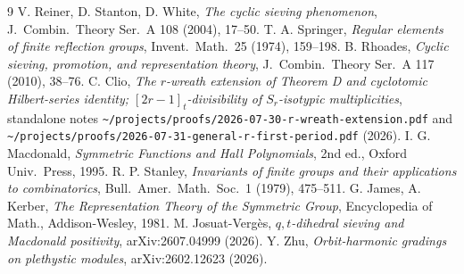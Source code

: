 \documentclass[11pt]{article}
\theoremstyle{definition}
\theoremstyle{remark}
\begin{document}
\begin{thebibliography}{9}
 V. Reiner, D. Stanton, D. White,
  \emph{The cyclic sieving phenomenon},
  J.~Combin.~Theory Ser.~A 108 (2004), 17--50.
 T. A. Springer,
  \emph{Regular elements of finite reflection groups},
  Invent.~Math.~25 (1974), 159--198.
 B. Rhoades,
  \emph{Cyclic sieving, promotion, and representation theory},
  J.~Combin.~Theory Ser.~A 117 (2010), 38--76.
 C. Clio,
  \emph{The $r$-wreath extension of Theorem D and cyclotomic Hilbert-series identity;
        $[2r-1]_t$-divisibility of $S_r$-isotypic multiplicities},
  standalone notes \verb|~/projects/proofs/2026-07-30-r-wreath-extension.pdf|
  and \verb|~/projects/proofs/2026-07-31-general-r-first-period.pdf| (2026).
 I. G. Macdonald,
  \emph{Symmetric Functions and Hall Polynomials}, 2nd ed.,
  Oxford Univ.\ Press, 1995.
 R. P. Stanley,
  \emph{Invariants of finite groups and their applications to combinatorics},
  Bull.~Amer.~Math.~Soc.\ 1 (1979), 475--511.
 G. James, A. Kerber,
  \emph{The Representation Theory of the Symmetric Group},
  Encyclopedia of Math., Addison-Wesley, 1981.
 M. Josuat-Verg\`es,
  \emph{$q,t$-dihedral sieving and Macdonald positivity},
  arXiv:2607.04999 (2026).
 Y. Zhu,
  \emph{Orbit-harmonic gradings on plethystic modules},
  arXiv:2602.12623 (2026).
\end{thebibliography}
\end{document}
